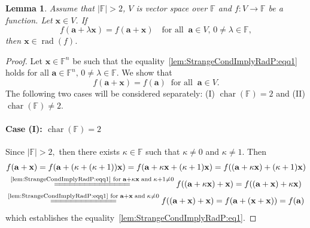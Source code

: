 \documentclass{elsarticle}
\DeclareMathOperator{\Char}{char}
\DeclareMathOperator{\rad}{rad}
\def\F{{\mathbb F}}
\newtheorem{lemma}[theorem]{Lemma}
\theoremstyle{definition}
\numberwithin{equation}{section}
\begin{document}
\begin{lemma}\label{lem:StrangeCondImplyRadP}
Assume that $|\F| > 2$, $V$ is vector space over $\F$ and $f\colon V \to \F$ be a function. Let $\mathbf x \in V$. If  
\begin{equation}\label{lem:StrangeCondImplyRadP:eqq1}
f(\mathbf a + \lambda \mathbf x) = f(\mathbf a + \mathbf x)\quad\mbox{for all}\;\;\mathbf a \in V,\, 0 \neq \lambda \in \F, 
\end{equation}
then $\mathbf x \in \rad (f)$.
\end{lemma}
\begin{proof}Let $\mathbf x \in \F^n$ be such that the equality~\eqref{lem:StrangeCondImplyRadP:eqq1} holds for all $\mathbf a \in \F^n,\, 0 \neq \lambda \in \F$. We show that 
\begin{equation}\label{lem:StrangeCondImplyRadP:eq1}
f(\mathbf a + \mathbf x) = f(\mathbf a)\;\;\mbox{for all}\;\; \mathbf a \in V.
\end{equation}
The following two cases will be considered separately: (I) $\Char(\F) = 2$ and (II) $\Char(\F) \neq 2$.

\paragraph{Case (I): $\Char(\F) = 2$} Since $|\F| > 2,$ then there exists $\kappa \in \F$ such that $\kappa \neq 0$ and $\kappa \neq 1$. Then 
\begin{multline*}
f(\mathbf a + \mathbf x) = f(\mathbf a + (\kappa + (\kappa + 1))\mathbf x) = f(\mathbf a + \kappa\mathbf x + (\kappa + 1)\mathbf x)
= f(\left(\mathbf a + \kappa\mathbf x\right) + (\kappa + 1)\mathbf x)\\
\overset{\scriptsize \mbox{\eqref{lem:StrangeCondImplyRadP:eqq1} for}\;\mathbf a + \kappa\mathbf x \;\mbox{and}\; \kappa + 1 \neq 0}{=\joinrel=\joinrel=\joinrel=\joinrel=\joinrel=\joinrel=\joinrel=\joinrel=\joinrel=\joinrel=\joinrel=\joinrel=\joinrel=\joinrel=} f(\left(\mathbf a + \kappa\mathbf x\right) + \mathbf x) =  f(\left(\mathbf a + \mathbf x\right) + \kappa\mathbf x)\\
\overset{\scriptsize \mbox{\eqref{lem:StrangeCondImplyRadP:eqq1} for}\;\mathbf a + \mathbf x \;\mbox{and}\; \kappa \neq 0}{=\joinrel=\joinrel=\joinrel=\joinrel=\joinrel=\joinrel=\joinrel=\joinrel=\joinrel=\joinrel=\joinrel=\joinrel=} f(\left(\mathbf a + \mathbf x\right) + \mathbf x)
= f(\mathbf a + \left(\mathbf x + \mathbf x\right)) =  f(\mathbf a)
\end{multline*}
which establishes the equality~\eqref{lem:StrangeCondImplyRadP:eq1}.

\end{proof}
\end{document}

